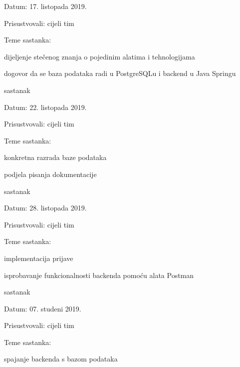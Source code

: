 \begin{packed_enum}
			\item[] \begin{packed_item}
				\item Datum: 17. listopada 2019.
				\item Prisustvovali: cijeli tim
				\item Teme sastanka:
				\begin{packed_item}
					\item dijeljenje stečenog znanja o pojedinim alatima i tehnologijama
					\item dogovor da se baza podataka radi u PostgreSQLu i backend u Java Springu
				\end{packed_item}
			\end{packed_item}
		
			\item  sastanak
			
			\item[] \begin{packed_item}
				\item Datum: 22. listopada 2019.
				\item Prisustvovali: cijeli tim
				\item Teme sastanka:
				\begin{packed_item}
					\item konkretna razrada baze podataka
					\item podjela pisanja dokumentacije
				\end{packed_item}
			\end{packed_item}
		
			\item  sastanak
			
			\item[] \begin{packed_item}
				\item Datum: 28. listopada 2019.
				\item Prisustvovali: cijeli tim
				\item Teme sastanka:
				\begin{packed_item}
					\item implementacija prijave
					\item isprobavanje funkcionalnosti backenda pomoću alata Postman
				\end{packed_item}
			\end{packed_item}
		
			\item  sastanak
			
			\item[] \begin{packed_item}
				\item Datum: 07. studeni 2019.
				\item Prisustvovali: cijeli tim
				\item Teme sastanka:
				\begin{packed_item}
					\item spajanje backenda s bazom podataka
				\end{packed_item}
			\end{packed_item}
		

\end{packed_enum}
